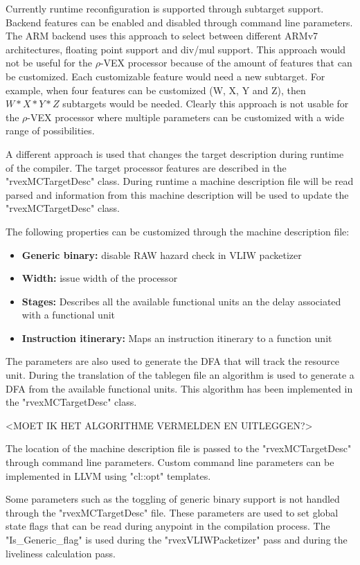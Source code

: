 Currently runtime reconfiguration is supported through subtarget support. Backend features can be enabled and disabled through command line parameters. The ARM backend uses this approach to select between different ARMv7 architectures, floating point support and div/mul support. This approach would not be useful for the $\rho$-VEX processor because of the amount of features that can be customized. Each customizable feature would need a new subtarget. For example, when four features can be customized (W, X, Y and Z), then $W*X*Y*Z$ subtargets would be needed. Clearly this approach is not usable for the $\rho$-VEX processor where multiple parameters can be customized with a wide range of possibilities.

A different approach is used that changes the target description during runtime of the compiler. The target processor features are described in the "rvexMCTargetDesc" class. During runtime a machine description file will be read parsed and information from this machine description will be used to update the "rvexMCTargetDesc" class. 

The following properties can be customized through the machine description file:

\begin{itemize}
  \item \textbf{Generic binary:} disable RAW hazard check in VLIW packetizer
  \item \textbf{Width:} issue width of the processor
  \item \textbf{Stages:} Describes all the available functional units an the delay associated with a functional unit
  \item \textbf{Instruction itinerary:} Maps an instruction itinerary to a function unit
\end{itemize}

The parameters are also used to generate the DFA that will track the resource unit. During the translation of the tablegen file an algorithm is used to generate a DFA from the available functional units. This algorithm has been implemented in the "rvexMCTargetDesc" class.

<MOET IK HET ALGORITHME VERMELDEN EN UITLEGGEN?>

The location of the machine description file is passed to the "rvexMCTargetDesc" through command line parameters. Custom command line parameters can be implemented in LLVM using "cl::opt" templates.

Some parameters such as the toggling of generic binary support is not handled through the "rvexMCTargetDesc" file. These parameters are used to set global state flags that can be read during anypoint in the compilation process. The "Is\_Generic\_flag" is used during the "rvexVLIWPacketizer" pass and during the liveliness calculation pass.


